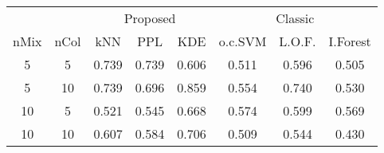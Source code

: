 
\begin{tabular}{cccccccc}
\toprule
\multicolumn{2}{c}{ } & \multicolumn{3}{c}{Proposed} & \multicolumn{3}{c}{Classic} \\
\cmidrule(l{3pt}r{3pt}){3-5} \cmidrule(l{3pt}r{3pt}){6-8}
nMix & nCol & kNN & PPL & KDE & o.c.SVM & L.O.F. & I.Forest\\
\midrule
5 & 5 & 0.739 & 0.739 & 0.606 & 0.511 & 0.596 & 0.505\\
5 & 10 & 0.739 & 0.696 & 0.859 & 0.554 & 0.740 & 0.530\\
10 & 5 & 0.521 & 0.545 & 0.668 & 0.574 & 0.599 & 0.569\\
10 & 10 & 0.607 & 0.584 & 0.706 & 0.509 & 0.544 & 0.430\\
\bottomrule
\end{tabular}